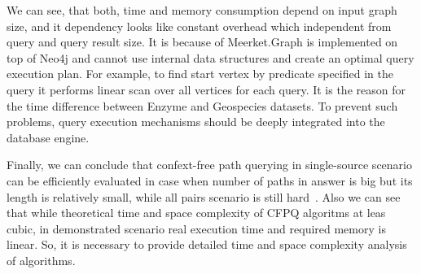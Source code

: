 We can see, that both, time and memory consumption depend on input graph size, and it dependency looks like constant overhead which independent from query and query result size. It is because of Meerket.Graph is implemented on top of Neo4j and cannot use internal data structures and create an optimal query execution plan. For example, to find start vertex by predicate specified in the query it performs linear scan over all vertices for each query. It is the reason for the time difference between Enzyme and Geospecies datasets. To prevent such problems, query execution mechanisms should be deeply integrated into the database engine.

Finally, we can conclude that confext-free path querying in single-source scenario can be efficiently evaluated in case when number of paths in answer is big but its length is relatively small, while all pairs scenario is still hard~\cite{10.1145/3335783.3335791}.
Also we can see that while theoretical time and space complexity of CFPQ algoritms at leas cubic, in demonstrated scenario real execution time and required memory is linear.
So, it is necessary to provide detailed time and space complexity analysis of algorithms.
